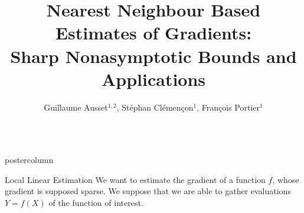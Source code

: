 \documentclass[dvipsnames]{beamer}
\title{Nearest Neighbour Based Estimates of Gradients: \\ Sharp Nonasymptotic Bounds and Applications}
\author{Guillaume Ausset$^{1,2}$, Stéphan Cl\'emen\c{c}on$^{1}$, Fran\c{c}ois Portier$^{1}$}
\institute{$^{1}$ T\'el\'ecom ParisTech, LTCI, Universit\'e Paris Saclay $^{2}$ BNP Paribas}
\newlength{\columnheight}
\begin{document}
\begin{frame}
\begin{columns}
    \begin{column}{.5\textwidth}
		\begin{beamercolorbox}[center]{postercolumn}
			\begin{minipage}{.98\textwidth}  %
				\parbox[t][\columnheight]{\textwidth}{ %
					\begin{myblock}{Local Linear Estimation}
                        We want to estimate the gradient of a function $f$, whose gradient is supposed sparse. We suppose that we are able to gather evaluations $Y = f(X)$ of the function of interest.\newline


\end{myblock}}
\end{minipage}
\end{beamercolorbox}
\end{column}
\end{columns}
\end{frame}
\end{document}
